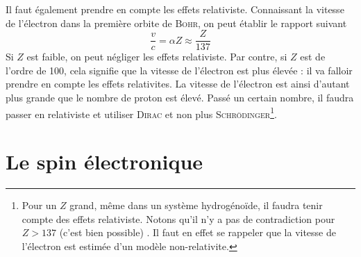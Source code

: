 Il faut également prendre en compte les effets relativiste. Connaissant la vitesse de l'électron dans 
la première orbite de \textsc{Bohr}, on peut établir le rapport suivant
\begin{equation}
\frac{v}{c} = \alpha Z \approx \frac{Z}{137}
\end{equation}
Si $Z$ est faible, on peut négliger les effets relativiste. Par contre, si $Z$ est de l'ordre de 100, cela
signifie que la vitesse de l'électron est plus élevée : il va falloir prendre en compte les effets 
relativites. La vitesse de l'électron est ainsi d'autant plus grande que le nombre de proton est élevé. 
Passé un certain nombre, il faudra passer en relativiste et utiliser \textsc{Dirac} et non plus
\textsc{Schrödinger}\footnote{Pour un $Z$ grand, même dans un système hydrogénoïde, il faudra tenir compte
des effets relativiste. Notons qu'il n'y a pas de contradiction pour $Z>137$ (c'est bien possible) . Il 
faut en effet se rappeler que la vitesse de l'électron est estimée d'un modèle non-relativite.}.


\section{Le spin électronique}
